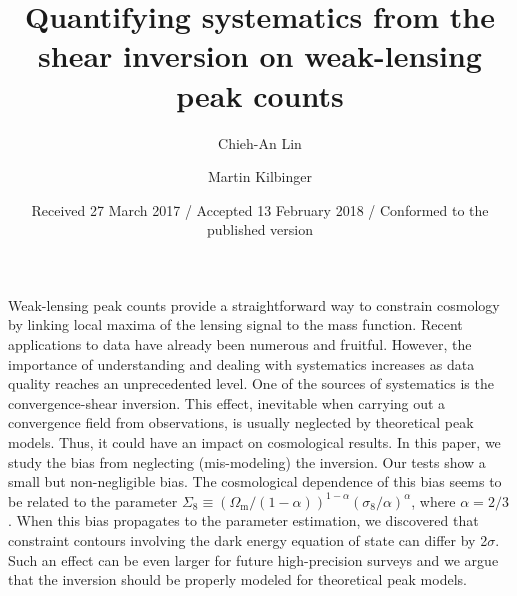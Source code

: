 \documentclass{aa} %
\newcommand{\OmegaM}{\Omega_\mathrm{m}}
\newcommand{\sigEig}{\sigma_8}
\begin{document}
\title{Quantifying systematics from the shear inversion on weak-lensing peak counts}
\author{Chieh-An Lin\inst{\ref{inst1},\ref{inst2},\ref{inst3}} \and Martin Kilbinger\inst{\ref{inst2},\ref{inst4}}}
\date{Received 27 March 2017 / Accepted 13 February 2018 / Conformed to the published version}

\abstract
        {Weak-lensing peak counts provide a straightforward way to constrain cosmology by linking local maxima of the lensing signal to the mass function. Recent applications to data have already been numerous and fruitful. However, the importance of understanding and dealing with systematics increases as data quality reaches an unprecedented level. One of the sources of systematics is the convergence-shear inversion. This effect, inevitable when carrying out a convergence field from observations, is usually neglected by theoretical peak models. Thus, it could have an impact on cosmological results. In this paper, we study the bias from neglecting (mis-modeling) the inversion. Our tests show a small but non-negligible bias. The cosmological dependence of this bias seems to be related to the parameter $\Sigma_8\equiv(\OmegaM/(1-\alpha))^{1-\alpha}(\sigEig/\alpha)^{\alpha}$, where $\alpha=2/3$. When this bias propagates to the parameter estimation, we discovered that constraint contours involving the dark energy equation of state can differ by 2$\sigma$. Such an effect can be even larger for future high-precision surveys and we argue that the inversion should be properly modeled for theoretical peak models.}
        



\maketitle
\end{document}
